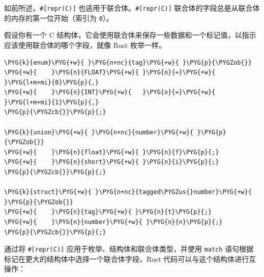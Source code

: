 如前所述，\texttt{\#[repr(C)]} 也适用于联合体。\texttt{\#[repr(C)]} 联合体的字段总是从联合体的内存的第一位开始（索引为 \texttt{0}）。

假设你有一个 C 结构体，它会使用联合体来保存一些数据和一个标记值，以指示应该使用联合体的哪个字段，就像 Rust 枚举一样。

\begin{Verbatim}[commandchars=\\\{\},breaklines=true,breakanywhere=true,fontsize=\codefont,xleftmargin=17bp]
\PYG{k}{enum}\PYG{+w}{ }\PYG{n+nc}{tag}\PYG{+w}{ }\PYG{p}{\PYGZob{}}
\PYG{+w}{    }\PYG{n}{FLOAT}\PYG{+w}{ }\PYG{o}{=}\PYG{+w}{ }\PYG{l+m+mi}{0}\PYG{p}{,}
\PYG{+w}{    }\PYG{n}{INT}\PYG{+w}{   }\PYG{o}{=}\PYG{+w}{ }\PYG{l+m+mi}{1}\PYG{p}{,}
\PYG{p}{\PYGZcb{}}\PYG{p}{;}

\PYG{k}{union}\PYG{+w}{ }\PYG{n+nc}{number}\PYG{+w}{ }\PYG{p}{\PYGZob{}}
\PYG{+w}{    }\PYG{n}{float}\PYG{+w}{ }\PYG{n}{f}\PYG{p}{;}
\PYG{+w}{    }\PYG{n}{short}\PYG{+w}{ }\PYG{n}{i}\PYG{p}{;}
\PYG{p}{\PYGZcb{}}\PYG{p}{;}

\PYG{k}{struct}\PYG{+w}{ }\PYG{n+nc}{tagged\PYGZus{}number}\PYG{+w}{ }\PYG{p}{\PYGZob{}}
\PYG{+w}{    }\PYG{n}{tag}\PYG{+w}{ }\PYG{n}{t}\PYG{p}{;}
\PYG{+w}{    }\PYG{n}{number}\PYG{+w}{ }\PYG{n}{n}\PYG{p}{;}
\PYG{p}{\PYGZcb{}}\PYG{p}{;}
\end{Verbatim}

通过将 \texttt{\#[repr(C)]} 应用于枚举、结构体和联合体类型，并使用 \texttt{match} 语句根据标记在更大的结构体中选择一个联合体字段，Rust 代码可以与这个结构体进行互操作：

